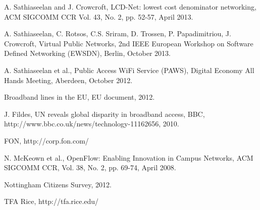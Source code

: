 \documentclass[conference]{IEEEtran}
\begin{document}
%
%
\begin{thebibliography}{15}







A. Sathiaseelan and J. Crowcroft, LCD-Net: lowest cost denominator networking, ACM SIGCOMM CCR Vol. 43, No. 2,  pp. 52-57, April 2013.

A. Sathiaseelan, C. Rotsos, C.S. Sriram, D. Trossen, P. Papadimitriou, J. Crowcroft, Virtual Public Networks, 2nd IEEE European Workshop on Software Defined Networking (EWSDN), Berlin, October 2013.

A. Sathiaseelan et al., Public Access WiFi Service (PAWS), Digital Economy All Hands Meeting, Aberdeen, October 2012.

Broadband lines in the EU, EU document, 2012.

J. Fildes, UN reveals global disparity in broadband access, BBC, http://www.bbc.co.uk/news/technology-11162656, 2010.

FON, http://corp.fon.com/

N. McKeown et al., OpenFlow: Enabling Innovation in Campus Networks, ACM SIGCOMM CCR, Vol. 38, No. 2, pp. 69-74, April 2008.

Nottingham Citizens Survey, 2012.

TFA Rice, http://tfa.rice.edu/






\end{thebibliography}
\end{document}

